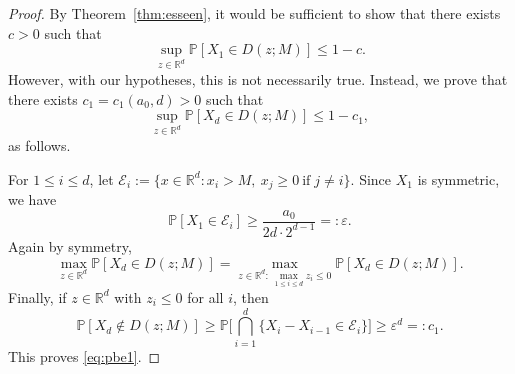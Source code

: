 \documentclass[11pt,a4paper]{article}
\numberwithin{equation}{section}
\theoremstyle{plain}
\theoremstyle{definition}
\newcommand\1{\mathds{1}}
\begin{document}
\begin{proof}
By Theorem~\ref{thm:esseen}, it would be sufficient to show that there exists $c>0$ such that
\begin{equation}
	\sup_{z\in \mathbb R^d}\mathbb P[X_1\in D(z;M)]\leq 1-c.
\end{equation}
However, with our hypotheses, this is not necessarily true.
Instead, we prove that there exists $c_1=c_1(a_0,d)>0$ such that
\begin{equation}\label{eq:pbe1}
	\sup_{z\in \mathbb R^d}\mathbb P[X_d\in D(z;M)]\leq 1-c_1,
\end{equation}
as follows.

For $1\leq i \leq d$, let $\mathcal E_i:=\{x\in \mathbb R^d: x_i> M, \: x_{j}\geq 0 \: \text{if}\; j\neq i\}$. Since $X_1$ is symmetric, we have
\begin{equation}
	\mathbb P[X_1\in \mathcal E_i]\geq \frac{a_0}{2d\cdot 2^{d-1}}=:\varepsilon.
\end{equation}
Again by symmetry,
\begin{equation}
    \max_{z\in \mathbb R^d}\mathbb P[X_d\in D(z;M)]
    =\max_{z \in \mathbb R^d: \: \max_{1 \le i \le d}z_i \le 0}
    \mathbb P[X_d\in D(z;M)].
\end{equation}
Finally, if $z\in \mathbb R^d$ with $z_i\leq 0$ for all $i$, then
\begin{equation}
	\mathbb P[X_d\notin D(z;M)]\geq \mathbb P\Big[\bigcap_{i=1}^d \{X_{i}-X_{i-1}\in \mathcal E_i\}\Big]\geq \varepsilon^d=:c_1.
\end{equation}
This proves \eqref{eq:pbe1}.


\end{proof}
\end{document}
